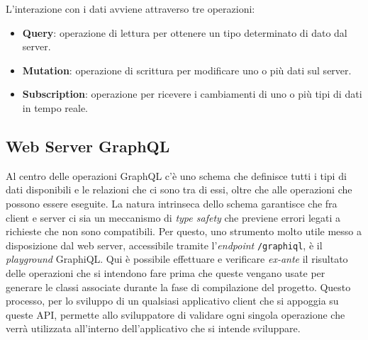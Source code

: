 L'interazione con i dati avviene attraverso tre operazioni: 
\begin{itemize}
	\item \textbf{Query}: operazione di lettura per ottenere un tipo determinato di dato dal server.
	\item \textbf{Mutation}:  operazione di scrittura per modificare uno o più dati sul server.
	\item \textbf{Subscription}: operazione per ricevere i cambiamenti di uno o più tipi di dati in tempo reale.
\end{itemize}

\subsection{Web Server GraphQL}

Al centro delle operazioni GraphQL c'è uno schema che definisce tutti i tipi di dati disponibili e le relazioni che ci sono tra di essi, oltre che alle operazioni che possono essere eseguite. La natura intrinseca dello schema garantisce che fra client e server ci sia un meccanismo di \textit{type safety} che previene errori legati a richieste che non sono compatibili. Per questo, uno strumento molto utile messo a disposizione dal web server, accessibile tramite l'\textit{endpoint} \texttt{/graphiql}, è il \textit{playground} GraphiQL. Qui è possibile effettuare e verificare \textit{ex-ante} il risultato delle operazioni che si intendono fare prima che queste vengano usate per generare le classi associate durante la fase di compilazione del progetto. Questo processo, per lo sviluppo di un qualsiasi applicativo client che si appoggia su queste \ac{API}, permette allo sviluppatore di validare ogni singola operazione che verrà utilizzata all'interno dell'applicativo che si intende sviluppare.

